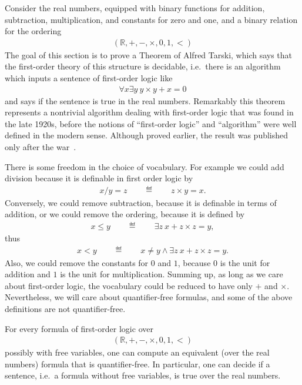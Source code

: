 \label{sec:tarski}
\newcommand{\bss}{\textsc{bss}\xspace}
\newcommand{\Real}{\mathbb R}
Consider the real numbers, equipped with binary functions for addition, subtraction, multiplication, and constants for zero and one, and a binary relation for the ordering
\begin{align*}
  (\Real, +, -, \times, 0, 1, <)
\end{align*}
The goal of this section is to prove a Theorem of Alfred Tarski, which says that the first-order theory of this structure is decidable, i.e.~there is an algorithm which inputs a sentence of first-order logic like
\begin{align*}
\forall x  \exists y \ y \times y + x = 0
\end{align*}
and says if the sentence is true in the real numbers. Remarkably this theorem represents a nontrivial algorithm dealing with first-order logic that was found in the late 1920s, before the notions of ``first-order logic'' and ``algorithm'' were well defined in the modern sense. Although proved earlier, the result was published only after the war~\cite{Tarski:1951vl}.

There is some freedom in the choice of vocabulary. For example we could add division because it is definable in first order logic by
\begin{align*}
  x / y = z \qquad \eqdef \qquad z \times y = x.
\end{align*}
Conversely, we could remove subtraction, because it is definable in terms of addition, or we could remove the ordering, because it is defined by
\begin{align*}
  x \leq y \qquad \eqdef \qquad \exists z \ x + z \times z = y,
\end{align*}
thus
\begin{align*}
  x < y \qquad \eqdef \qquad x \ne y \land \exists z \ x + z \times z = y.
\end{align*}
Also, we could remove the constants for $0$ and $1$, because $0$ is the unit for addition and $1$ is the unit for multiplication. Summing up, as long as we care about first-order logic, the vocabulary could be reduced to have only $+$ and $\times$. Nevertheless, we will care about quantifier-free formulas, and some of the above definitions are not quantifier-free.

\begin{theorem}\label{thm:tarski}
	For every formula of first-order logic over 
	\begin{align*}
  (\Real, +, -, \times, 0, 1, <)
\end{align*}
possibly with free variables, one can compute an equivalent (over the real numbers) formula that is quantifier-free. In particular, one can decide if a sentence, i.e.~a formula without free variables, is true over the real numbers.
\end{theorem}









